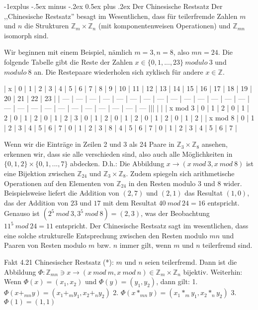 \documentclass[a4paper]{article}
\makeatletter
\renewcommand{\subsection}{\@startsection{subsection}{2}{0mm}%
 {-1explus -.5ex minus -.2ex}%
 {0.5ex plus .2ex}%
 {\normalfont\normalsize\bfseries}}
\makeatother
\begin{document}
\begin{multicols}{3}
    \subsection{Der Chinesische Restsatz}
    Der ,,Chinesische Restsatz'' besagt im Wesentlichen, dass für teilerfremde Zahlen $m$ und $n$ die Strukturen $\mathbb{Z}_m \times\mathbb{Z}_n$ (mit komponentenweisen Operationen) und $\mathbb{Z}_{mn}$ isomorph sind.

    Wir beginnen mit einem Beispiel, nämlich $m=3,n=8$, also $mn=24$. Die folgende Tabelle gibt die Reste der Zahlen $x\in\{0,1,...,23\}\ modulo\ 3$ und $modulo\ 8$ an. Die Restepaare wiederholen sich zyklisch für andere $x\in\mathbb{Z}$.

    | x   | 0   | 1   | 2   | 3   | 4   | 5   | 6   | 7   | 8   | 9   | 10  | 11  | 12  | 13  | 14  | 15  | 16  | 17  | 18  | 19  | 20  | 21  | 22  | 23  |
    | --- | --- | --- | --- | --- | --- | --- | --- | --- | --- | --- | --- | --- | --- | --- | --- | --- | --- | --- | --- | --- | --- | --- | --- | --- |||  |  |
    | x mod 3 | 0   | 1   | 2   | 0   | 1   | 2   | 0   | 1   | 2   | 0   | 1   | 2   | 3   | 0   | 1   | 2   | 0   | 1   | 2   | 0   | 1   | 2   | 0   | 1   | 2   |
    | x mod 8 | 0   | 1   | 2   | 3   | 4   | 5   | 6   | 7   | 0   | 1   | 2   | 3   | 8   | 4   | 5   | 6   | 7   | 0   | 1   | 2   | 3   | 4   | 5   | 6   | 7   |

    Wenn wir die Einträge in Zeilen 2 und 3 als 24 Paare in $\mathbb{Z}_3 \times\mathbb{Z}_8$ ansehen, erkennen wir, dass sie alle verschieden sind, also auch alle Möglichkeiten in $\{0,1,2\}\times\{0,1,...,7\}$ abdecken. D.h.: Die Abbildung $x\rightarrow (x\ mod\ 3,x\ mod\ 8)$ ist eine Bijektion zwischen $\mathbb{Z}_{24}$ und $\mathbb{Z}_3\times\mathbb{Z}_8$. Zudem spiegeln sich arithmetische Operationen auf den Elementen von $\mathbb{Z}_{24}$ in den Resten modulo $3$ und $8$ wider. Beispielsweise liefert die Addition von $(2,7)$ und $(2,1)$ das Resultat $(1,0)$, das der Addition von $23$ und $17$ mit dem Resultat $40\ mod\ 24 = 16$ entspricht. Genauso ist $(2^5\ mod\ 3, 3^5\ mod\ 8)=(2,3)$, was der Beobachtung $11^5\ mod\ 24 = 11$ entspricht.
    Der Chinesische Restsatz sagt im wesentlichen, dass eine solche strukturelle Entsprechung zwischen den Resten modulo $mn$ und Paaren von Resten modulo $m$ bzw. $n$ immer gilt, wenn $m$ und $n$ teilerfremd sind.

    Fakt 4.21 Chinesischer Restsatz (*): $m$ und $n$ seien teilerfremd. Dann ist die Abbildung $\Phi:\mathbb{Z}_{mn} \owns x \rightarrow (x\ mod\ m, x\ mod\ n)\in\mathbb{Z}_m\times\mathbb{Z}_n$ bijektiv. Weiterhin: Wenn $\Phi(x)=(x_1,x_2)$ und $\Phi(y)=(y_1,y_2)$, dann gilt:
    1. $\Phi(x+_{mn} y) = (x_1 +_m y_1 , x_2 +_n y_2)$
    2. $\Phi(x*_{mn} y) = (x_1 *_m y_1 , x_2 *_n y_2)$
    3. $\Phi(1) = (1,1)$


\end{multicols}
\end{document}
